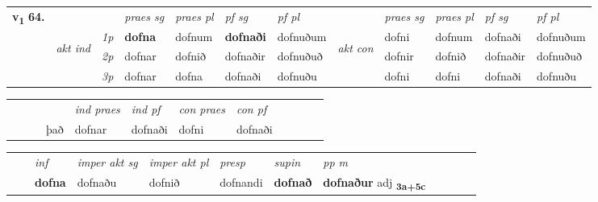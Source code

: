 \begin{tabular}{llllllllllll} \toprule
\multirow{4}{*}{{{\textbf{v{\textsubscript{1}}} \Large{\textbf{64.}}}}}  & &   &  \textit{praes sg}  & \textit{praes pl}  &\textit{ pf sg} & \textit{pf pl} &  &  \textit{praes sg}  & \textit{praes pl}  & \textit{pf sg} & \textit{pf pl } \\*
	\cmidrule{4-7} \cmidrule{9-12}
 & \multirow{3}{*}{\begin{turn}{90}\textit{akt ind}\end{turn}} & {\textit{1p}} & \textbf{dofna} & dofnum    & \textbf{dofnaði} & dofnuðum & \multirow{3}{*}{\begin{turn}{90}\textit{akt con}\end{turn}} &dofni & dofnum & dofnaði & dofnuðum\\*
& &  {\textit{2p}} &  dofnar  & dofnið   & dofnaðir & dofnuðuð & & dofnir & dofnið & dofnaðir & dofnuðuð \\*
& &  {\textit{3p}} & dofnar & dofna   & dofnaði & dofnuðu & & dofni & dofni& dofnaði & dofnuðu  \\*
\cmidrule{4-7} \cmidrule{9-12}
\end{tabular}


\begin{tabular}{llllllllllll}
 & &  & &  \textit{ind praes} & \textit{ind pf} & \textit{con praes} & \textit{con pf} \\*
&  & & það & dofnar & dofnaði & dofni & dofnaði \\*
\cmidrule{5-9}
\end{tabular}


\begin{tabular}{llllllllllll}
 & & \textit{inf} & \textit{imper akt sg} & \textit{imper akt pl}   & \textit{presp} & \textit{supin}  & \textit{pp m}     \\*
  & & \textbf{dofna} & dofnaðu  & dofnið   & dofnandi &  \textbf{dofnað}  & \textbf{dofnaður} adj \textbf{\textsubscript{3a+5c}} \\*
\cmidrule{1-12}
\end{tabular}



